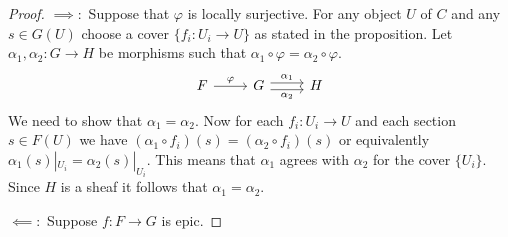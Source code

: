 \begin{proof}
	$\implies:$ Suppose that $\varphi$ is locally surjective. For any object $U$ of $C$ and any $s \in G(U)$ choose a cover $\{f_i: U_i \to U\}$ as stated in the proposition. Let $\alpha_1, \alpha_2: G \to H$ be morphisms such that $\alpha_1 \circ \varphi = \alpha_2 \circ \varphi$.
	\[
		\begin{tikzcd}
			F & G & H
			\arrow["\varphi", from=1-1, to=1-2]
			\arrow["{\alpha_2}"', shift right=1, from=1-2, to=1-3]
			\arrow["{\alpha_1}", shift left=1, from=1-2, to=1-3]
		\end{tikzcd}\]
	We need to show that $\alpha_1 = \alpha_2$.  Now for each $f_i: U_i \to U$ and each section $s \in F(U)$ we have $(\alpha_1 \circ f_i)(s) = (\alpha_2 \circ f_i)(s)$ or equivalently  $\alpha_1(s)|_{U_i} = \alpha_2(s)|_{U_i}$. This means that $\alpha_1$ agrees with $\alpha_2$ for the cover $\{U_i\}$. Since $H$ is a sheaf it follows that $\alpha_1 = \alpha_2$.\par
	$\impliedby:$ Suppose $f \colon F \to G$ is epic.
\end{proof}

